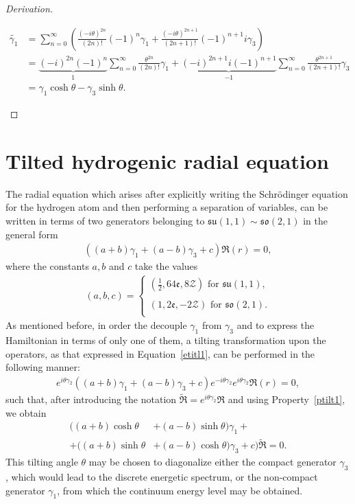 \documentclass[12pt,a4paper]{report}
\theoremstyle{definition}
\newenvironment{derivation}
  {\renewcommand\qedsymbol{$\square$}\begin{proof}[Derivation]}
  {\end{proof}}
\theoremstyle{remark}
\theoremstyle{remark}
\newcounter{mycounter}
\newenvironment{noindlist}
 {\begin{list}{\roman{mycounter}.~~}{\usecounter{mycounter} \labelsep=0em \labelwidth=0em \leftmargin=0em \itemindent=0em}}
 {\end{list}}
\begin{document}
\begin{appendices}
\begin{derivation}
\begin{noindlist}
\begin{align*}
\widetilde{\gamma_1} &=\sum_{n=0}^{\infty}\left(\frac{(-i\theta)^{2n}}{(2n)!}(-1)^n\gamma_1+\frac{(-i\theta)^{2n+1}}{(2n+1)!}(-1)^{n+1}i\gamma_3\right) \\
&= \underbrace{(-i)^{2n}(-1)^n}_{1}\sum_{n=0}^{\infty}\frac{\theta^{2n}}{(2n)!}\gamma_1+\underbrace{(-i)^{2n+1}i(-1)^{n+1}}_{-1}\sum_{n=0}^{\infty}\frac{\theta^{2n+1}}{(2n+1)!}\gamma_3\\
&= \gamma_1\cosh\theta-\gamma_3\sinh\theta.
\end{align*}
\end{noindlist}
\end{derivation}

\section{Tilted hydrogenic radial equation}
The radial equation which arises after explicitly writing the Schrödinger equation for the hydrogen atom and then performing a separation of variables, can be written in terms of two generators belonging to $\mathfrak{su}(1,1)\sim \mathfrak{so}(2,1)$ in the general form
\begin{align*}
((a+b)\gamma_1+(a-b)\gamma_3+c)\mathfrak{R}(r)=0,
\end{align*}
where the constants $a,b$ and $c$ take the values
\begin{align}\label{etilt6}
(a,b,c)=\left\{
\begin{array}{ll}
\left(\frac{1}{2},64\mathfrak{e},8\mathcal{Z}\right) \text{ for } \mathfrak{su}(1,1),\\ \\
(1,2\mathfrak{e},-2\mathcal{Z}) \text{ for } \mathfrak{so}(2,1).\\
\end{array}
\right.
\end{align}
As mentioned before, in order the decouple $\gamma_1$ from $\gamma_3$ and to express the Hamiltonian in terms of only one of them, a tilting transformation upon the operators, as that expressed in Equation~\ref{etitl1}, can be performed in the following manner:
\begin{align*}
e^{i\theta\gamma_2}((a+b)\gamma_1+(a-b)\gamma_3+c)e^{-i\theta\gamma_2}e^{i\theta\gamma_2}\mathfrak{R}(r)=0,
\end{align*}
such that, after introducing the notation $\widetilde{\mathfrak{R}}=e^{i\theta\gamma_2}\mathfrak{R}$ and using Property~\ref{ptilt1}, we obtain
\begin{equation}\label{etilt2}
\begin{aligned}
((a+b)\cosh\theta&+(a-b)\sinh\theta)\gamma_1+\\
+((a+b)\sinh\theta&+(a-b)\cosh\theta)\gamma_3+c)\widetilde{\mathfrak{R}}=0.
\end{aligned}
\end{equation}
This tilting angle $\theta$ may be chosen to diagonalize either the compact generator $\gamma_3$, which would lead to the discrete energetic spectrum, or  the non-compact generator $\gamma_1$, from which the continuum energy level may be obtained. 


\end{appendices}
\end{document}
